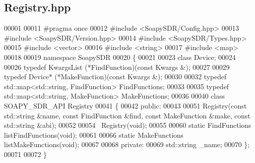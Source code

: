 \subsection{Registry.\+hpp}
\label{Registry_8hpp_source}

\begin{DoxyCode}
00001 
00011 \textcolor{preprocessor}{#pragma once}
00012 \textcolor{preprocessor}{#include <SoapySDR/Config.hpp>}
00013 \textcolor{preprocessor}{#include <SoapySDR/Version.hpp>}
00014 \textcolor{preprocessor}{#include <SoapySDR/Types.hpp>}
00015 \textcolor{preprocessor}{#include <vector>}
00016 \textcolor{preprocessor}{#include <string>}
00017 \textcolor{preprocessor}{#include <map>}
00018 
00019 \textcolor{keyword}{namespace }SoapySDR
00020 \{
00021 
00023 \textcolor{keyword}{class }Device;
00024 
00026 \textcolor{keyword}{typedef} KwargsList (*FindFunction)(\textcolor{keyword}{const} Kwargs &);
00027 
00029 \textcolor{keyword}{typedef} Device* (*MakeFunction)(\textcolor{keyword}{const} Kwargs &);
00030 
00032 \textcolor{keyword}{typedef} std::map<std::string, FindFunction> FindFunctions;
00033 
00035 \textcolor{keyword}{typedef} std::map<std::string, MakeFunction> MakeFunctions;
00036 
00040 \textcolor{keyword}{class }SOAPY_SDR_API Registry
00041 \{
00042 \textcolor{keyword}{public}:
00043 
00051     Registry(\textcolor{keyword}{const} std::string &name, \textcolor{keyword}{const} FindFunction &find, \textcolor{keyword}{const} 
      MakeFunction &make, \textcolor{keyword}{const} std::string &abi);
00052 
00054     ~Registry(\textcolor{keywordtype}{void});
00055 
00060     \textcolor{keyword}{static} FindFunctions listFindFunctions(\textcolor{keywordtype}{void});
00061 
00066     \textcolor{keyword}{static} MakeFunctions listMakeFunctions(\textcolor{keywordtype}{void});
00067 
00068 \textcolor{keyword}{private}:
00069     std::string _name;
00070 \};
00071 
00072 \}
\end{DoxyCode}
